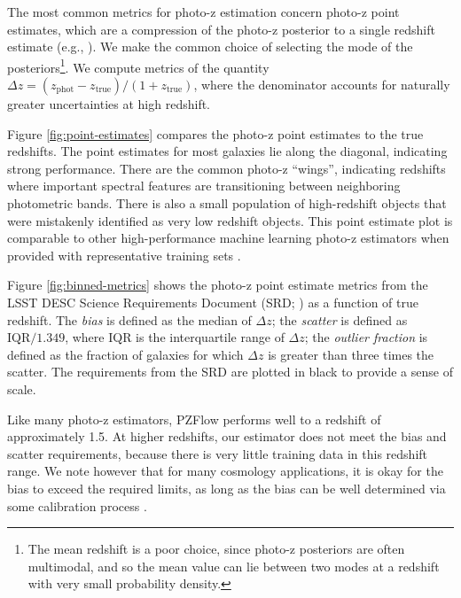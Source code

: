 \documentclass[twocolumn,twocolappendix]{aastex631}
\begin{document}
The most common metrics for photo-z estimation concern photo-z point estimates, which are a compression of the photo-z posterior to a single redshift estimate (e.g., \citealt{hildebrandt2010,sanchez2014}).
We make the common choice of selecting the mode of the posteriors\footnote{The mean redshift is a poor choice, since photo-z posteriors are often multimodal, and so the mean value can lie between two modes at a redshift with very small probability density.}.
We compute metrics of the quantity $\Delta z = (z_\text{phot} - z_\text{true}) / (1 + z_\text{true})$, where the denominator accounts for naturally greater uncertainties at high redshift.

Figure \ref{fig:point-estimates} compares the photo-z point estimates to the true redshifts.
The point estimates for most galaxies lie along the diagonal, indicating strong performance.
There are the common photo-z ``wings'', indicating redshifts where important spectral features are transitioning between neighboring photometric bands.
There is also a small population of high-redshift objects that were mistakenly identified as very low redshift objects.
This point estimate plot is comparable to other high-performance machine learning photo-z estimators when provided with representative training sets \citep{sanchez2014}.

Figure \ref{fig:binned-metrics} shows the photo-z point estimate metrics from the LSST DESC Science Requirements Document (SRD; \citealt{descSRD}) as a function of true redshift.
The \emph{bias} is defined as the median of $\Delta z$; the \emph{scatter} is defined as $\text{IQR} / 1.349$, where IQR is the interquartile range of $\Delta z$; the \emph{outlier fraction} is defined as the fraction of galaxies for which $\Delta z$ is greater than three times the scatter.
The requirements from the SRD are plotted in black to provide a sense of scale.

Like many photo-z estimators, PZFlow performs well to a redshift of approximately 1.5.
At higher redshifts, our estimator does not meet the bias and scatter requirements, because there is very little training data in this redshift range.
We note however that for many cosmology applications, it is okay for the bias to exceed the required limits, as long as the bias can be well determined via some calibration process \citep{newman2015}.
\end{document}
